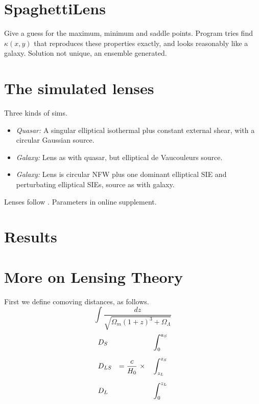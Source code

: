 \documentclass[12pt,preprint]{aastex}
\begin{document}
\section{SpaghettiLens}

Give a guess for the maximum, minimum and saddle points.  Program
tries find $\kappa(x,y)$ that reproduces these properties exactly, and
looks reasonably like a galaxy.  Solution not unique, an ensemble
generated.

\section{The simulated lenses}

Three kinds of sims.

\begin{itemize}
\item {\em Quasar:\/} A singular elliptical isothermal plus constant
  external shear, with a circular Gaussian source.
\item {\em Galaxy:\/} Lens as with quasar, but elliptical de
  Vaucouleurs source.
\item {\em Galaxy:\/} Lens is circular NFW plus one dominant
  elliptical SIE and perturbating elliptical SIEs, source as with
  galaxy.
\end{itemize}
Lenses follow \cite{2001astro.ph..2341K,2001astro.ph..2340K}.
Parameters in online supplement.

\section{Results}

\appendix

\section{More on Lensing Theory}

First we define comoving distances, as follows.
\begin{equation}
\int \frac{dz}{\sqrt{\Omega_m(1+z)^3 + \Omega_\Lambda}}
\end{equation}
\begin{equation}
\begin{aligned}
&D_S    &                                &\int_0^{a_S} \\
\noalign{\medskip}
&D_{LS} & = \frac c{H_0} \ \times \quad  &\int_{z_L}^{z_S} \\
\noalign{\medskip}
&D_L    &                                &\int_0^{z_L}
\end{aligned}
\end{equation}
\end{document}
